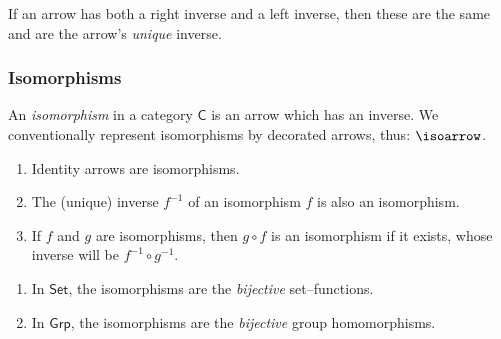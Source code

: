\begin{thm}
	If an arrow has both a right inverse and a left inverse, 
	then these are the same and are the arrow's \textit{unique} inverse.
\end{thm}



\subsubsection{Isomorphisms}



\begin{df}[Isomorphisms]
	An \textit{isomorphism}  in a category $\mathsf{C}$ is an arrow which has an inverse.  
	We conventionally represent isomorphisms by decorated arrows, 
	thus: {\color{purple} $\isoarrow$}.
\end{df}




\begin{thm}
	\begin{enumerate}[itemsep=5pt,parsep=5pt,leftmargin=3em,topsep=5pt,label=(\arabic*)] %
		\item 
		Identity arrows are isomorphisms. 

		\item 
		The (unique) inverse $f^{-1}$ of an isomorphism $f$ is also an isomorphism.

		\item 
		If $f$ and $g$ are isomorphisms, 
		then $g \circ f$ is an isomorphism if it exists, 
		whose inverse will be $f^{-1} \circ g^{-1}$.
	\end{enumerate}
\end{thm}



\begin{example}
	\qquad

	\begin{enumerate}[itemsep=5pt,parsep=5pt,leftmargin=3em,topsep=5pt,label=(\arabic*)] 
		\item 
		In $\mathsf{Set}$, the isomorphisms are the \textit{bijective} set--functions.

		\item 
		In $\mathsf{Grp}$, the isomorphisms are the \textit{bijective} group homomorphisms.
	\end{enumerate}
\end{example}



